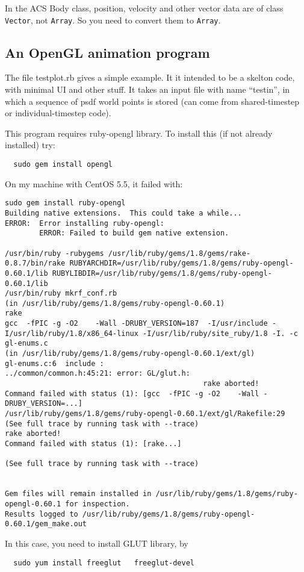 \documentclass[12pt]{article}
\begin{document}
In the ACS Body class, position, velocity and other vector data are of
class {\tt Vector}, not {\tt Array}. So you need to convert them to
{\tt Array}.

\subsection{An OpenGL animation program}

The file testplot.rb gives a simple example. It it intended to be a
skelton code, with minimal UI and other stuff. It takes an input file
with name ``testin'', in which a sequence of psdf world points is
stored (can come from shared-timestep or individual-timestep code).

This program requires ruby-opengl library. To install this (if not
already installed) try:
\begin{verbatim}
  sudo gem install opengl
\end{verbatim}
On my machine with CentOS 5.5, it failed with:
\begin{verbatim}
sudo gem install ruby-opengl
Building native extensions.  This could take a while...
ERROR:  Error installing ruby-opengl:
        ERROR: Failed to build gem native extension.

/usr/bin/ruby -rubygems /usr/lib/ruby/gems/1.8/gems/rake-0.8.7/bin/rake RUBYARCHDIR=/usr/lib/ruby/gems/1.8/gems/ruby-opengl-0.60.1/lib RUBYLIBDIR=/usr/lib/ruby/gems/1.8/gems/ruby-opengl-0.60.1/lib
/usr/bin/ruby mkrf_conf.rb
(in /usr/lib/ruby/gems/1.8/gems/ruby-opengl-0.60.1)
rake
gcc  -fPIC -g -O2    -Wall -DRUBY_VERSION=187  -I/usr/include -I/usr/lib/ruby/1.8/x86_64-linux -I/usr/lib/ruby/site_ruby/1.8 -I. -c gl-enums.c
(in /usr/lib/ruby/gems/1.8/gems/ruby-opengl-0.60.1/ext/gl)
gl-enums.c:6  include :
../common/common.h:45:21: error: GL/glut.h: 
                                              rake aborted!
Command failed with status (1): [gcc  -fPIC -g -O2    -Wall -DRUBY_VERSION=...]
/usr/lib/ruby/gems/1.8/gems/ruby-opengl-0.60.1/ext/gl/Rakefile:29
(See full trace by running task with --trace)
rake aborted!
Command failed with status (1): [rake...]

(See full trace by running task with --trace)


Gem files will remain installed in /usr/lib/ruby/gems/1.8/gems/ruby-opengl-0.60.1 for inspection.
Results logged to /usr/lib/ruby/gems/1.8/gems/ruby-opengl-0.60.1/gem_make.out
\end{verbatim}

In this case, you need to install GLUT library, by
\begin{verbatim}
  sudo yum install freeglut   freeglut-devel
\end{verbatim}

    
\end{document}
